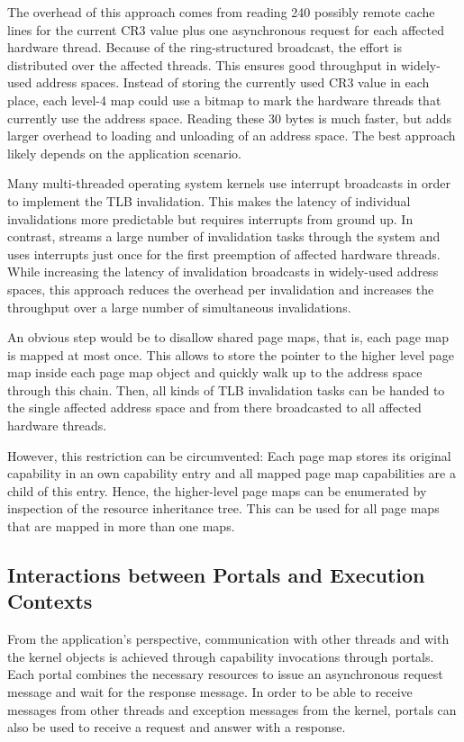 The overhead of this approach comes from reading 240 possibly remote cache lines for the current CR3 value plus one asynchronous request for each affected hardware thread. Because of the ring-structured broadcast, the effort is distributed over the affected threads. This ensures good throughput in widely-used address spaces. Instead of storing the currently used CR3 value in each place, each level-4 map could use a bitmap to mark the hardware threads that currently use the address space. Reading these 30 bytes is much faster, but adds larger overhead to loading and unloading of an address space. The best approach likely depends on the application scenario.

Many multi-threaded operating system kernels use interrupt broadcasts in order to implement the TLB invalidation. This makes the latency of individual invalidations more predictable but requires interrupts from ground up. In contrast, \mythos streams a large number of invalidation tasks through the system and uses interrupts just once for the first preemption of affected hardware threads. While increasing the latency of invalidation broadcasts in widely-used address spaces, this approach reduces the overhead per invalidation and increases the throughput over a large number of simultaneous invalidations. 

An obvious step would be to disallow shared page maps, that is, each page map is mapped at most once. This allows to store the pointer to the higher level page map inside each page map object and quickly  walk up to the address space through this chain. Then, all kinds of TLB invalidation tasks can be handed to the single affected address space and from there broadcasted to all affected hardware threads.

However, this restriction can be circumvented: Each page map stores its original capability in an own capability entry and all mapped page map capabilities are a child of this entry. Hence, the higher-level page maps can be enumerated by inspection of the resource inheritance tree. This can be used for all page maps that are mapped in more than one maps.   

\subsection{Interactions between Portals and Execution Contexts}
From the application's perspective, communication with other threads and with the kernel objects is achieved through capability invocations through portals. Each portal combines the necessary resources to issue an asynchronous request message and wait for the response message. In order to be able to receive messages from other threads and exception messages from the kernel, portals can also be used to receive a request and answer with a response. 

